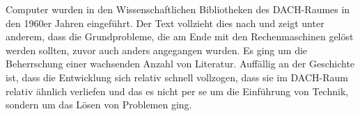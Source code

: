 Computer wurden in den Wissenschaftlichen Bibliotheken des DACH-Raumes
in den 1960er Jahren eingeführt. Der Text vollzieht dies nach und zeigt
unter anderem, dass die Grundprobleme, die am Ende mit den
Rechenmaschinen gelöst werden sollten, zuvor auch anders angegangen
wurden. Es ging um die Beherrschung einer wachsenden Anzahl von
Literatur. Auffällig an der Geschichte ist, dass die Entwicklung sich
relativ schnell vollzogen, dass sie im DACH-Raum relativ ähnlich
verliefen und das es nicht per se um die Einführung von Technik, sondern
um das Lösen von Problemen ging.
